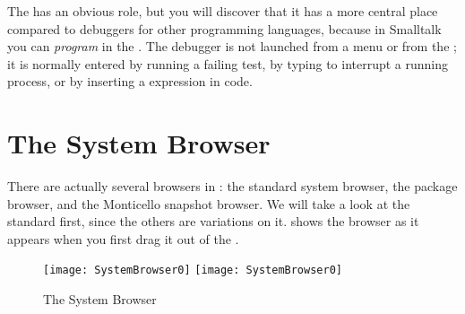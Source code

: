 \documentclass[a4paper,10pt,twoside]{book}
\begin{document}
The  has an obvious role, but you will discover that it has a more central place compared to debuggers for other programming languages, because in Smalltalk you can \emph{program} in the .  The debugger is not launched from a menu or from the \toolsflap; it is normally entered by running a failing test, by typing  to interrupt a running process, or by inserting a  expression in code.





\section{The System Browser}
\label{sec:browser} %

There are actually several browsers in \sq: the standard system browser, the package browser, and the Monticello snapshot browser. 
We will take a look at the standard  first, since the others are variations on it.
 shows the browser as it appears when you first drag it out of the \toolsflapind.

\begin{figure}[htbp]
   \centering
   \ifluluelse
	 {\texttt{[image: SystemBrowser0]} }
	 {\texttt{[image: SystemBrowser0]} }
   \caption{The System Browser}
   \label{fig:SystemBrowser0}
\end{figure}
\end{document}
